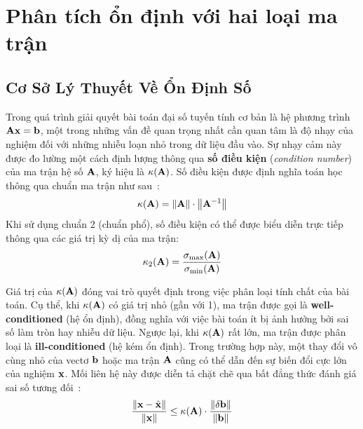 \section{Phân tích ổn định với hai loại ma trận}

\subsection{Cơ Sở Lý Thuyết Về Ổn Định Số}

Trong quá trình giải quyết bài toán đại số tuyến tính cơ bản là hệ phương trình $\mathbf{A}\mathbf{x} = \mathbf{b}$, một trong những vấn đề quan trọng nhất cần quan tâm là độ nhạy của nghiệm đối với những nhiễu loạn nhỏ trong dữ liệu đầu vào. Sự nhạy cảm này được đo lường một cách định lượng thông qua \textbf{số điều kiện} (\textit{condition number}) của ma trận hệ số $\mathbf{A}$, ký hiệu là $\kappa(\mathbf{A})$. Số điều kiện được định nghĩa toán học thông qua chuẩn ma trận như sau~\cite{trefethen1997, higham2002}:
\begin{equation}
    \kappa(\mathbf{A}) = \left\lVert\mathbf{A}\right\rVert \cdot \left\lVert\mathbf{A}^{-1}\right\rVert
\end{equation}
Khi sử dụng chuẩn 2 (chuẩn phổ), số điều kiện có thể được biểu diễn trực tiếp thông qua các giá trị kỳ dị của ma trận:
\begin{equation}
    \kappa_2(\mathbf{A}) = \frac{\sigma_{\max}(\mathbf{A})}{\sigma_{\min}(\mathbf{A})}
\end{equation}

\begin{tcolorbox}[enhanced, colback=blue!8!white, colframe=primaryblue,
    title=\textbf{Ý nghĩa của số điều kiện}, fonttitle=\bfseries]
Giá trị của $\kappa(\mathbf{A})$ đóng vai trò quyết định trong việc phân loại tính chất của bài toán. Cụ thể, khi $\kappa(\mathbf{A})$ có giá trị nhỏ (gần với 1), ma trận được gọi là \textbf{well-conditioned} (hệ ổn định), đồng nghĩa với việc bài toán ít bị ảnh hưởng bởi sai số làm tròn hay nhiễu dữ liệu. Ngược lại, khi $\kappa(\mathbf{A})$ rất lớn, ma trận được phân loại là \textbf{ill-conditioned} (hệ kém ổn định). Trong trường hợp này, một thay đổi vô cùng nhỏ của vectơ $\mathbf{b}$ hoặc ma trận $\mathbf{A}$ cũng có thể dẫn đến sự biến đổi cực lớn của nghiệm $\mathbf{x}$. Mối liên hệ này được diễn tả chặt chẽ qua bất đẳng thức đánh giá sai số tương đối~\cite{higham2002}:
\begin{equation}
    \frac{\left\lVert\mathbf{x} - \hat{\mathbf{x}}\right\rVert}{\left\lVert\mathbf{x}\right\rVert} \le \kappa(\mathbf{A})\cdot \frac{\left\lVert\delta \mathbf{b}\right\rVert}{\left\lVert\mathbf{b}\right\rVert}
\end{equation}
\end{tcolorbox}

